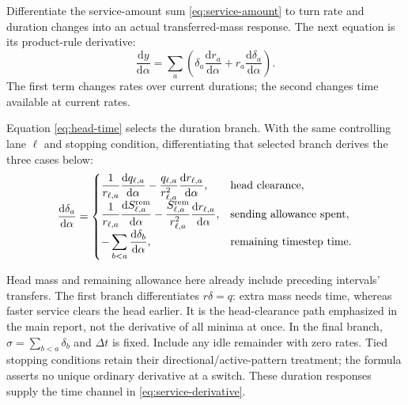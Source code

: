 \documentclass[10pt,a4paper]{article}
\newcommand{\rev}[1]{{\color{revisionred}#1}}
\begin{document}
Differentiate the service-amount sum \eqref{eq:service-amount} to turn
rate and duration changes into an actual transferred-mass response.
\rev{The next equation is its product-rule derivative:}
\begin{equation}
 \frac{\mathrm dy}{\mathrm d\alpha}
 =\sum_a\left(\delta_a\frac{\mathrm dr_a}{\mathrm d\alpha}
              +r_a\frac{\mathrm d\delta_a}{\mathrm d\alpha}\right).
 \label{eq:service-derivative}
\end{equation}
The first term changes rates over current durations; the second changes
time available at current rates.
\par\begin{samepage}
Equation \eqref{eq:head-time} selects
the duration branch. With the same controlling lane $\ell$ and stopping
condition,
\rev{differentiating that selected branch derives the three cases below:}
\begin{equation}
 \frac{\mathrm d\delta_a}{\mathrm d\alpha}
 =\begin{cases}
 \displaystyle\frac1{r_{\ell,a}}\frac{\mathrm dq_{\ell,a}}{\mathrm d\alpha}
 -\frac{q_{\ell,a}}{r_{\ell,a}^2}\frac{\mathrm dr_{\ell,a}}{\mathrm d\alpha},
 &\text{head clearance},\\[4pt]
 \displaystyle\frac1{r_{\ell,a}}\frac{\mathrm dS_{\ell,a}^{\rm rem}}{\mathrm d\alpha}
 -\frac{S_{\ell,a}^{\rm rem}}{r_{\ell,a}^2}\frac{\mathrm dr_{\ell,a}}{\mathrm d\alpha},
 &\text{sending allowance spent},\\[4pt]
 \displaystyle-\sum_{b<a}\frac{\mathrm d\delta_b}{\mathrm d\alpha},
 &\text{remaining timestep time}.
 \end{cases}
 \label{eq:duration-derivative}
\end{equation}
\par\end{samepage}
Head mass and remaining allowance here already include preceding
intervals' transfers. The first branch differentiates $r\delta=q$:
extra mass needs time, whereas faster service clears the head earlier.
It is the head-clearance path emphasized in the main report, not the
derivative of all minima at once. In the final branch,
$\sigma=\sum_{b<a}\delta_b$ and $\Delta t$ is fixed. Include any idle
remainder with zero rates. Tied stopping conditions retain their
directional/active-pattern treatment; the formula asserts no unique
ordinary derivative at a switch. These duration responses supply the
time channel in \eqref{eq:service-derivative}.
\end{document}
